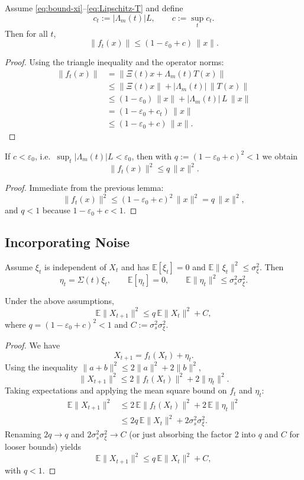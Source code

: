 \documentclass[11pt]{article}
\begin{document}
\begin{lemma}
Assume \eqref{eq:bound-xi}--\eqref{eq:Lipschitz-T} and define
\[
c_t := |\Lambda_m(t)| L,\qquad c := \sup_t c_t.
\]
Then for all $t$,
\[
\|f_t(x)\| \le (1-\varepsilon_0 + c)\,\|x\|.
\]
\end{lemma}

\begin{proof}
Using the triangle inequality and the operator norms:
\begin{align*}
\|f_t(x)\|
&= \|\Xi(t)x + \Lambda_m(t)T(x)\| \\
&\le \|\Xi(t)x\| + |\Lambda_m(t)|\,\|T(x)\| \\
&\le (1-\varepsilon_0)\,\|x\| + |\Lambda_m(t)|\,L\,\|x\| \\
&= (1-\varepsilon_0 + c_t)\,\|x\| \\
&\le (1-\varepsilon_0 + c)\,\|x\|.
\end{align*}
\end{proof}

\begin{corollary}
If $c<\varepsilon_0$, i.e.\ $\sup_t |\Lambda_m(t)| L < \varepsilon_0$, then with $q:=(1-\varepsilon_0 + c)^2<1$ we obtain
\[
\|f_t(x)\|^2 \le q\,\|x\|^2.
\]
\end{corollary}

\begin{proof}
Immediate from the previous lemma:
\[
\|f_t(x)\|^2 \le (1-\varepsilon_0 + c)^2\,\|x\|^2 = q\,\|x\|^2,
\]
and $q<1$ because $1-\varepsilon_0 + c < 1$.
\end{proof}

\subsection{Incorporating Noise}

Assume $\xi_t$ is independent of $X_t$ and has $\mathbb{E}[\xi_t]=0$ and $\mathbb{E}\|\xi_t\|^2\le \sigma_\xi^2$. Then
\[
\eta_t = \Sigma(t)\xi_t,\qquad \mathbb{E}[\eta_t]=0,\qquad 
\mathbb{E}\|\eta_t\|^2 \le \sigma_s^2 \sigma_\xi^2.
\]

\begin{lemma}
Under the above assumptions,
\[
\mathbb{E}\|X_{t+1}\|^2 \le q\,\mathbb{E}\|X_t\|^2 + C,
\]
where $q=(1-\varepsilon_0 + c)^2<1$ and $C := \sigma_s^2 \sigma_\xi^2$.
\end{lemma}

\begin{proof}
We have
\[
X_{t+1} = f_t(X_t) + \eta_t.
\]
Using the inequality $\|a+b\|^2\le 2\|a\|^2 + 2\|b\|^2$,
\[
\|X_{t+1}\|^2 \le 2\|f_t(X_t)\|^2 + 2\|\eta_t\|^2.
\]
Taking expectations and applying the mean square bound on $f_t$ and $\eta_t$:
\begin{align*}
\mathbb{E}\|X_{t+1}\|^2
&\le 2\,\mathbb{E}\|f_t(X_t)\|^2 + 2\,\mathbb{E}\|\eta_t\|^2 \\
&\le 2q\,\mathbb{E}\|X_t\|^2 + 2\sigma_s^2\sigma_\xi^2.
\end{align*}
Renaming $2q\to q$ and $2\sigma_s^2\sigma_\xi^2\to C$ (or just absorbing the factor 2 into $q$ and $C$ for looser bounds) yields
\[
\mathbb{E}\|X_{t+1}\|^2 \le q\,\mathbb{E}\|X_t\|^2 + C,
\]
with $q<1$.
\end{proof}
\end{document}
